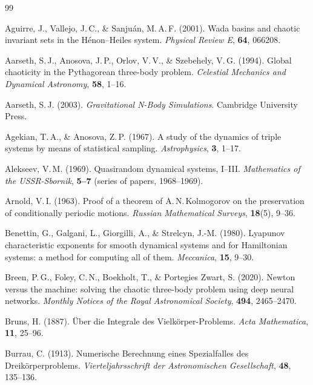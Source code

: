 \documentclass[11pt,a4paper]{article}
\begin{document}
\begin{thebibliography}{99}

Aguirre, J., Vallejo, J.\,C., \& Sanju\'{a}n, M.\,A.\,F. (2001).
Wada basins and chaotic invariant sets in the H\'{e}non--Heiles system.
\textit{Physical Review E}, \textbf{64}, 066208.

Aarseth, S.\,J., Anosova, J.\,P., Orlov, V.\,V., \& Szebehely, V.\,G. (1994).
Global chaoticity in the Pythagorean three-body problem.
\textit{Celestial Mechanics and Dynamical Astronomy}, \textbf{58}, 1--16.

Aarseth, S.\,J. (2003).
\textit{Gravitational N-Body Simulations}.
Cambridge University Press.

Agekian, T.\,A., \& Anosova, Z.\,P. (1967).
A study of the dynamics of triple systems by means of statistical sampling.
\textit{Astrophysics}, \textbf{3}, 1--17.

Alekseev, V.\,M. (1969).
Quasirandom dynamical systems, I--III.
\textit{Mathematics of the USSR-Sbornik}, \textbf{5--7} (series of papers, 1968--1969).

Arnold, V.\,I. (1963).
Proof of a theorem of A.\,N.\,Kolmogorov on the preservation of conditionally periodic motions.
\textit{Russian Mathematical Surveys}, \textbf{18}(5), 9--36.

Benettin, G., Galgani, L., Giorgilli, A., \& Strelcyn, J.-M. (1980).
Lyapunov characteristic exponents for smooth dynamical systems and for Hamiltonian systems:
a method for computing all of them.
\textit{Meccanica}, \textbf{15}, 9--30.

Breen, P.\,G., Foley, C.\,N., Boekholt, T., \& Portegies Zwart, S. (2020).
Newton versus the machine: solving the chaotic three-body problem using deep neural networks.
\textit{Monthly Notices of the Royal Astronomical Society}, \textbf{494}, 2465--2470.

Bruns, H. (1887).
\"{U}ber die Integrale des Vielk\"{o}rper-Problems.
\textit{Acta Mathematica}, \textbf{11}, 25--96.

Burrau, C. (1913).
Numerische Berechnung eines Spezialfalles des Dreik\"{o}rperproblems.
\textit{Vierteljahrsschrift der Astronomischen Gesellschaft}, \textbf{48}, 135--136.


\end{thebibliography}
\end{document}
